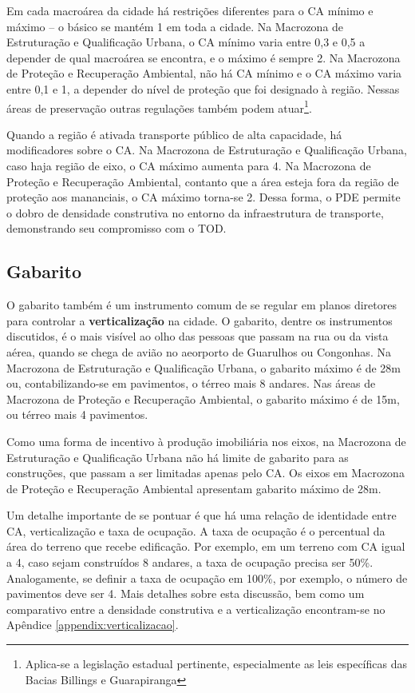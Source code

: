 Em cada macroárea da cidade há restrições diferentes para o CA mínimo e máximo -- o básico se mantém 1 em toda a cidade. Na Macrozona de Estruturação e Qualificação Urbana, o CA mínimo varia entre 0,3 e 0,5 a depender de qual macroárea se encontra, e o máximo é sempre 2. Na Macrozona de Proteção e Recuperação Ambiental, não há CA mínimo e o CA máximo varia entre 0,1 e 1, a depender do nível de proteção que foi designado à região. Nessas áreas de preservação outras regulações também podem atuar\footnote{Aplica-se a legislação estadual pertinente, especialmente as leis específicas das Bacias Billings e Guarapiranga}.

Quando a região é ativada transporte público de alta capacidade, há modificadores sobre o CA. Na Macrozona de Estruturação e Qualificação Urbana, caso haja região de eixo, o CA máximo aumenta para 4. Na Macrozona de Proteção e Recuperação Ambiental, contanto que a área esteja fora da região de proteção aos mananciais, o CA máximo torna-se 2. Dessa forma, o PDE permite o dobro de densidade construtiva no entorno da infraestrutura de transporte, demonstrando seu compromisso com o TOD.

\subsection*{Gabarito}

O gabarito também é um instrumento comum de se regular em planos diretores para controlar a \textbf{verticalização} na cidade. O gabarito, dentre os instrumentos discutidos, é o mais visível ao olho das pessoas que passam na rua ou da vista aérea, quando se chega de avião no aeorporto de Guarulhos ou Congonhas. Na Macrozona de Estruturação e Qualificação Urbana, o gabarito máximo é de 28m ou, contabilizando-se em pavimentos, o térreo mais 8 andares. Nas áreas de Macrozona de Proteção e Recuperação Ambiental, o gabarito máximo é de 15m, ou térreo mais 4 pavimentos.

Como uma forma de incentivo à produção imobiliária nos eixos, na Macrozona de Estruturação e Qualificação Urbana não há limite de gabarito para as construções, que passam a ser limitadas apenas pelo CA. Os eixos em Macrozona de Proteção e Recuperação Ambiental apresentam gabarito máximo de 28m.

Um detalhe importante de se pontuar é que há uma relação de identidade entre CA, verticalização e taxa de ocupação. A taxa de ocupação é o percentual da área do terreno que recebe edificação. Por exemplo, em um terreno com CA igual a 4, caso sejam construídos 8 andares, a taxa de ocupação precisa ser 50\%. Analogamente, se definir a taxa de ocupação em 100\%, por exemplo, o número de pavimentos deve ser 4. Mais detalhes sobre esta discussão, bem como um comparativo entre a densidade construtiva e a verticalização encontram-se no Apêndice \ref{appendix:verticalizacao}.

